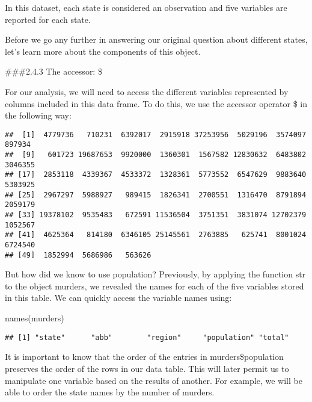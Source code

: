 \documentclass[
]{article}
\newenvironment{Shaded}{\begin{snugshade}}{\end{snugshade}}
\newcommand{\FunctionTok}[1]{\textcolor[rgb]{0.00,0.00,0.00}{#1}}
\newcommand{\NormalTok}[1]{#1}
\newcommand{\SpecialCharTok}[1]{\textcolor[rgb]{0.00,0.00,0.00}{#1}}
\begin{document}
In this dataset, each state is considered an observation and five
variables are reported for each state.

Before we go any further in answering our original question about
different states, let's learn more about the components of this object.

\#\#\#2.4.3 The accessor: \$

For our analysis, we will need to access the different variables
represented by columns included in this data frame. To do this, we use
the accessor operator \$ in the following way:

\begin{Shaded}
\end{Shaded}

\begin{verbatim}
##  [1]  4779736   710231  6392017  2915918 37253956  5029196  3574097   897934
##  [9]   601723 19687653  9920000  1360301  1567582 12830632  6483802  3046355
## [17]  2853118  4339367  4533372  1328361  5773552  6547629  9883640  5303925
## [25]  2967297  5988927   989415  1826341  2700551  1316470  8791894  2059179
## [33] 19378102  9535483   672591 11536504  3751351  3831074 12702379  1052567
## [41]  4625364   814180  6346105 25145561  2763885   625741  8001024  6724540
## [49]  1852994  5686986   563626
\end{verbatim}

But how did we know to use population? Previously, by applying the
function str to the object murders, we revealed the names for each of
the five variables stored in this table. We can quickly access the
variable names using:

\begin{Shaded}
\begin{Highlighting}[]
\FunctionTok{names}\NormalTok{(murders)}
\end{Highlighting}
\end{Shaded}

\begin{verbatim}
## [1] "state"      "abb"        "region"     "population" "total"
\end{verbatim}

It is important to know that the order of the entries in
murders\$population preserves the order of the rows in our data table.
This will later permit us to manipulate one variable based on the
results of another. For example, we will be able to order the state
names by the number of murders.
\end{document}
